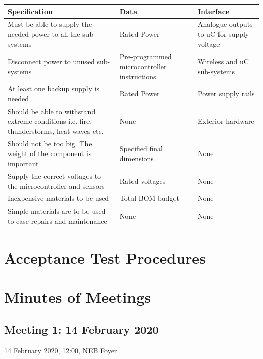 \documentclass[12pt]{article}
\begin{document}
\begin{center}
  \begin{table}[!htb]
    
    \hskip-2.2cm\begin{tabular}{|p{10cm}|p{4cm}|p{4cm}|}
        \hline
        \textbf{Specification} & \textbf{Data} & \textbf{Interface} \\
        \hline
        Must be able to supply the needed power to all the sub-systems & Rated Power & Analogue outputs to uC for supply voltage \\[0.3cm]
        Disconnect power to unused sub-systems & Pre-programmed microcontroller instructions & Wireless and uC sub-systems\\[0.3cm]
        At least one backup supply is needed & Rated Power & Power supply rails\\[0.3cm]
        Should be able to withstand extreme conditions i.e. fire, thunderstorms, heat waves etc. & None & Exterior hardware\\[0.3cm]
        Should not be too big. The weight of the component is important & Specified final dimensions & None\\[0.3cm]
        Supply the correct voltages to the microcontroller and sensors & Rated voltages & None\\[0.3cm]
        Inexpensive materials to be used & Total BOM budget & None\\[0.3cm]
        Simple materials are to be used to ease repairs and maintenance & None & None \\[0.3cm]

        \hline

    \end{tabular}    
    
    \label{tab:summary_measurments}
   \end{table}
\end{center}

\newpage
\section{Acceptance Test Procedures}

\newpage
\section{Minutes of Meetings}
\subsection{Meeting 1: 14 February 2020}
14 February 2020, 12:00, NEB Foyer
\end{document}
